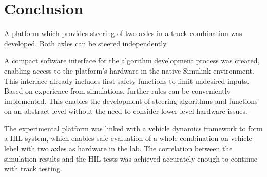 \documentclass[root.tex]{subfiles}
\begin{document}
{\pagestyle{empty}}
\section{Conclusion}
\label{chap:Conclusion}


A platform which provides steering of two axles in a truck-combination was developed. Both axles can be steered independently.

A compact software interface for the algorithm development process was created, enabling access to the platform's hardware in the native Simulink environment. This interface already includes first safety functions to limit undesired inputs. Based on experience from simulations, further rules can be conveniently implemented. This enables the development of steering algorithms and functions on an abstract level without the need to consider lower level hardware issues. 

The experimental platform was linked with a vehicle dynamics framework to form a \gls{HIL}-system, which enables safe evaluation of a whole combination on vehicle lebel with two axles as hardware in the lab. The correlation between the simulation results and the \gls{HIL}-tests was achieved accurately enough to continue with track testing. 
\end{document}
